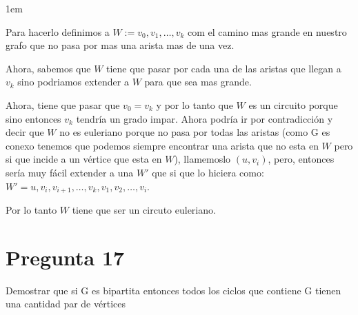 \documentclass[12pt, fleqn]{article}                            %
\newenvironment{SmallIndentation}[1][0.75em]                    %
        {\begin{adjustwidth}{#1}{}\begin{footnotesize}}             %
        {\end{footnotesize}\end{adjustwidth}}                       %
\theoremstyle{break}                                            %
\begin{document}
\begin{SmallIndentation}[1em]
\begin{itemize}
                Para hacerlo definimos a $W := v_0, v_1, \dots, v_{k}$ com el camino mas grande en nuestro grafo que no
                pasa por mas una arista mas de una vez.

                Ahora, sabemos que $W$ tiene que pasar por cada una de las aristas
                que llegan a $v_k$ sino podriamos extender a $W$ para que sea mas grande.
                
                Ahora, tiene que pasar que $v_0 = v_k$ y por lo tanto que $W$ es un circuito
                porque sino entonces $v_k$ tendría un grado impar. Ahora podría ir por contradicción 
                y decir que $W$ no es euleriano porque no pasa por todas las aristas
                (como G es conexo tenemos que podemos siempre encontrar una arista que no esta en $W$
                pero si que incide a un vértice que esta en $W$), llamemoslo $(u, v_i)$, pero, entonces
                sería muy fácil extender a una $W'$ que si que lo hiciera como: 
                $W' = u, v_i, v_{i+1}, \dots, v_k, v_1, v_2, \dots, v_i$.

                Por lo tanto $W$ tiene que ser un circuto euleriano.

        \end{itemize}

    \end{SmallIndentation}



    


    \clearpage
    \section{Pregunta 17}

        Demostrar que si G es bipartita entonces todos los ciclos que contiene G
        tienen una cantidad par de vértices
\end{document}
